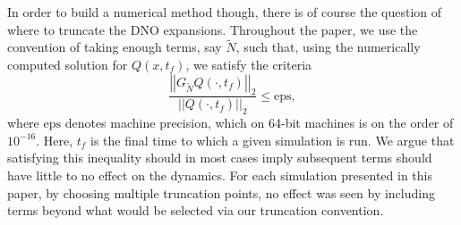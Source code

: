 \documentclass[a4paper,11pt]{article}
\newcommand{\gnorm}[1]{\left|\left| #1\right|\right|}
\begin{document}
In order to build a numerical method though, there is of course the question of where to truncate the DNO expansions.  Throughout the paper, we use the convention of taking enough terms, say $\tilde{N}$, such that, using the numerically computed solution for $Q(x,t_{f})$, we satisfy the criteria  
\begin{equation}
\frac{\gnorm{G_{\tilde{N}} Q(\cdot,t_{f})}_{2}}{\gnorm{Q(\cdot,t_{f})}_{2}} \leq \mbox{eps},
\label{trunccond}
\end{equation}
where $\mbox{eps}$ denotes machine precision, which on 64-bit machines is on the order of $10^{-16}$.  Here, $t_{f}$ is the final time to which a given simulation is run.  We argue that satisfying this inequality should in most cases imply subsequent terms should have little to no effect on the dynamics.  For each simulation presented in this paper, by choosing multiple truncation points, no effect was seen by including terms beyond what would be selected via our truncation convention.
\end{document}
